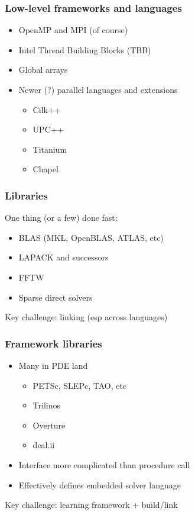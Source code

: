 \documentclass{beamer}
\begin{document}
\begin{frame}
  \frametitle{Low-level frameworks and languages}

  \begin{itemize}
  \item OpenMP and MPI (of course)
  \item Intel Thread Building Blocks (TBB)
  \item Global arrays
  \item Newer (?) parallel languages and extensions
    \begin{itemize}
    \item Cilk++
    \item UPC++
    \item Titanium
    \item Chapel
    \end{itemize}
  \end{itemize}
\end{frame}


\begin{frame}
  \frametitle{Libraries}

  One thing (or a few) done fast:
  \begin{itemize}
  \item BLAS (MKL, OpenBLAS, ATLAS, etc)
  \item LAPACK and successors
  \item FFTW
  \item Sparse direct solvers
  \end{itemize}
  Key challenge: linking (esp across languages)
\end{frame}


\begin{frame}
  \frametitle{Framework libraries}

  \begin{itemize}
  \item Many in PDE land
    \begin{itemize}
    \item PETSc, SLEPc, TAO, etc
    \item Trilinos
    \item Overture
    \item deal.ii
    \end{itemize}
  \item Interface more complicated than procedure call
  \item Effectively defines embedded solver language
  \end{itemize}
  Key challenge: learning framework + build/link
\end{frame}
\end{document}
